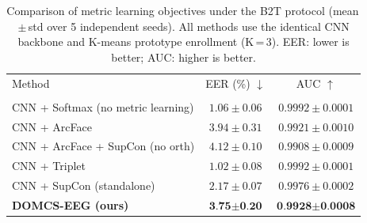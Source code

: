 
\begin{table}[t]
\centering
\caption{Comparison of metric learning objectives under the B2T protocol
(mean\,$\pm$\,std over 5 independent seeds).
All methods use the identical CNN backbone and K-means
prototype enrollment (K\,=\,3). EER: lower is better;
AUC: higher is better.}
\label{tab:baseline_ml}
\begin{tabular}{lcc}
\toprule
Method & EER (\%) $\downarrow$ & AUC $\uparrow$ \\\\
\midrule
        CNN + Softmax (no metric learning) & $1.06±0.06$ & $0.9992±0.0001$ \\
        CNN + ArcFace & $3.94±0.31$ & $0.9921±0.0010$ \\
        CNN + ArcFace + SupCon (no orth) & $4.12±0.10$ & $0.9908±0.0009$ \\
        CNN + Triplet & $1.02±0.08$ & $0.9992±0.0001$ \\
        CNN + SupCon (standalone) & $2.17±0.07$ & $0.9976±0.0002$ \\
        \textbf{DOMCS-EEG (ours)} & $\textbf{3.75±0.20}$ & $\textbf{0.9928±0.0008}$ \\
\bottomrule
\end{tabular}
\end{table}
